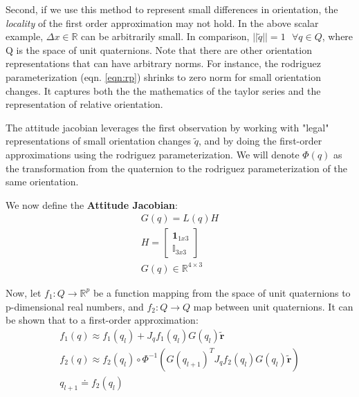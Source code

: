 \documentclass{article}
\begin{document}
Second, if we use this method to represent small differences in orientation, the \textit{locality} of the first order approximation may not hold. In the above scalar example, $\Delta x \in \mathbb{R}$ can be arbitrarily small. In comparison, $||\tilde{q}|| = 1 \mbox{ } \forall q \in Q$, where Q is the space of unit quaternions. Note that there are other orientation representations that can have arbitrary norms. For instance, the rodriguez parameterization (eqn. \ref{eqn:rp}) shrinks to zero norm for small orientation changes. It captures both the the mathematics of the taylor series and the representation of relative orientation.

The attitude jacobian leverages the first observation by working with "legal" representations of small orientation changes $\tilde{q}$, and by doing the first-order approximations using the rodriguez parameterization. We will denote $\Phi(q)$ as the transformation from the quaternion to the rodriguez parameterization of the same orientation.


We now define the \textbf{Attitude Jacobian}:
\begin{gather}
    G(q) = L(q)H \\
    H = \left[
        \begin{array}{c}
            \pmb{1}_{1x3} \\
            \mathbb{I}_{3x3}
        \end{array}
        \right] \\
    G(q) \in \mathbb{R}^{4\times 3}
\end{gather}

Now, let $f_1: Q \rightarrow \mathbb{R}^p$ be a function mapping from the space of unit quaternions to p-dimensional real numbers, and $f_2: Q \rightarrow Q$ map between unit quaternions. It can be shown that to a first-order approximation:
\begin{gather}
    f_1(q) \approx f_1(q_l) + J_{q} f_1(q_l) G(q_l) \tilde{\pmb{r}} \\
    f_2(q) \approx f_2(q_l) \circ \Phi^{-1}(G(q_{l+1})^T J_q f_2(q_l) G(q_l) \tilde{\pmb{r}}) \\
    q_{l+1} \doteq f_2(q_l) \\
\end{gather}
\end{document}

